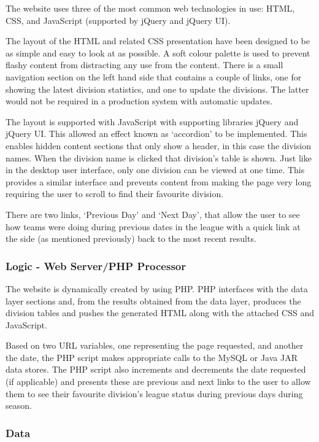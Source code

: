 The website uses three of the most common web technologies in use: HTML, CSS,
and JavaScript (supported by jQuery and jQuery UI).

The layout of the HTML and related CSS presentation have been designed to be
as simple and easy to look at as possible. A soft colour palette is used to
prevent flashy content from distracting any use from the content. There is
a small navigation section on the left hand side that contains a couple of
links, one for showing the latest division statistics, and one to update
the divisions. The latter would not be required in a production system with
automatic updates.

The layout is supported with JavaScript with supporting libraries jQuery and
jQuery UI. This allowed an effect known as `accordion' to be implemented. This
enables hidden content sections that only show a header, in this case the
division names. When the division name is clicked that division's table is
shown. Just like in the desktop user interface, only one division can be viewed
at one time. This provides a similar interface and prevents content from
making the page very long requiring the user to scroll to find their
favourite division.

There are two links, `Previous Day' and `Next Day', that allow the user to
see how teams were doing during previous dates in the league with a quick
link at the side (as mentioned previously) back to the most recent results.

\subsubsection{Logic - Web Server/PHP Processor}

The website is dynamically created by using PHP. PHP interfaces with 
the data layer sections and, from the results obtained from the data layer,
produces the division tables and pushes the generated HTML along with the
attached CSS and JavaScript.

Based on two URL variables, one representing the page requested, and another
the date, the PHP script makes appropriate calls to the MySQL or Java JAR data
stores. The PHP script also increments and decrements the date requested (if
applicable) and presents these are previous and next links to the user to allow
them to see their favourite division's league status during previous days
during season.

\subsubsection{Data}

